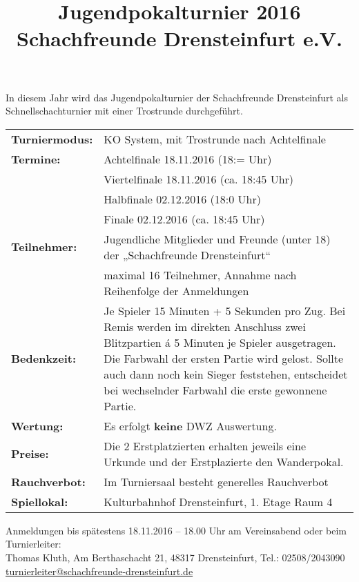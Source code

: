 \documentclass[a4paper,parskip=full-,DIV18]{scrartcl}
\title{Jugendpokalturnier 2016\\Schachfreunde Drensteinfurt e.V.}
\date{}
\begin{document}
\maketitle

In diesem Jahr wird das Jugendpokalturnier der Schachfreunde Drensteinfurt als Schnellschachturnier mit einer Trostrunde durchgeführt.

\bigskip

\begin{tabular}{p{3 cm} p{13.5 cm}}
	\textbf{Turniermodus:} & KO System, mit Trostrunde nach Achtelfinale          \\
	\textbf{Termine:}      & Achtelfinale 18.11.2016 (18:= Uhr)                  \\
	                       & Viertelfinale 18.11.2016 (ca. 18:45 Uhr)             \\
	                       & Halbfinale 02.12.2016 (18:0 Uhr)                    \\
	                       & Finale 02.12.2016 (ca. 18:45 Uhr)                    \\
	\textbf{Teilnehmer:}   & Jugendliche Mitglieder und Freunde (unter 18) der „Schachfreunde Drensteinfurt“ \\
	\textbf{}             & maximal 16 Teilnehmer, Annahme nach Reihenfolge der Anmeldungen \\
	\textbf{Bedenkzeit:}             & Je Spieler 15 Minuten + 5 Sekunden pro Zug. Bei Remis werden im direkten Anschluss zwei Blitzpartien á 5 Minuten je Spieler ausgetragen. Die Farbwahl der ersten Partie wird gelost. Sollte auch dann noch kein Sieger feststehen, entscheidet bei wechselnder Farbwahl die erste gewonnene Partie. \\
	\textbf{Wertung:}             & Es erfolgt \textbf{keine} DWZ Auswertung. \\
	\textbf{Preise:}             & Die 2 Erstplatzierten erhalten jeweils eine Urkunde und der Erstplazierte den Wanderpokal. \\
	\textbf{Rauchverbot:}             & Im Turniersaal besteht generelles Rauchverbot \\
	\textbf{Spiellokal:}             & Kulturbahnhof Drensteinfurt, 1. Etage Raum 4
\end{tabular}


\bigskip

Anmeldungen bis spätestens 18.11.2016 – 18.00 Uhr am Vereinsabend oder beim Turnierleiter:\\
Thomas Kluth, Am Berthaschacht 21, 48317 Drensteinfurt, Tel.: 02508/2043090\\
\href{mailto:turnierleiter@schachfreunde-drensteinfurt.de}{turnierleiter@schachfreunde-drensteinfurt.de}
\end{document}
